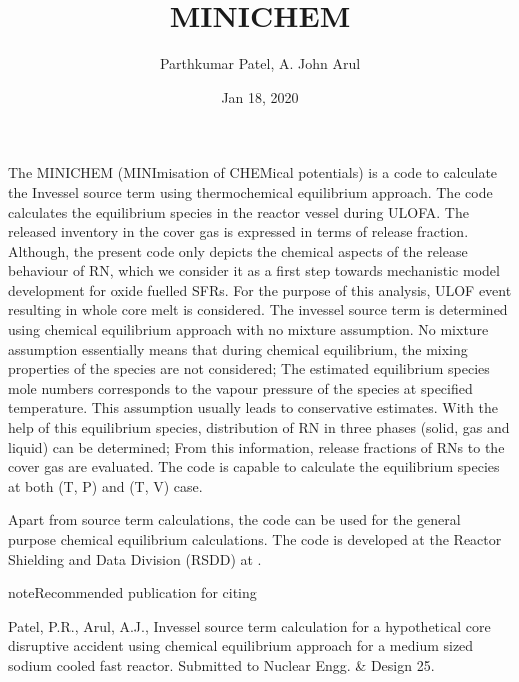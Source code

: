 \documentclass[letterpaper,10pt,english]{sphinxmanual}
\title{MINICHEM}
\date{Jan 18, 2020}
\author{Parthkumar Patel, A.\@{} John Arul}
\begin{document}
\pagestyle{empty}
\sphinxmaketitle
\pagestyle{plain}
\sphinxtableofcontents
\pagestyle{normal}
\label{\detokenize{index::doc}}


The MINICHEM (MINImisation of CHEMical potentials) is a code to calculate the In\sphinxhyphen{}vessel source term using thermochemical equilibrium approach. The code calculates the equilibrium species in the reactor vessel during ULOFA. The released inventory in the cover gas is expressed in terms of release fraction. Although, the
present code only depicts the chemical aspects of the release behaviour of RN,
which we consider it as a first step towards mechanistic model development for
oxide fuelled SFRs. For the purpose of this analysis, ULOF event resulting in
whole core melt is considered.
The in\sphinxhyphen{}vessel source term is determined using chemical equilibrium approach
with no mixture assumption. No mixture assumption essentially means that
during chemical equilibrium, the mixing properties of the species are not
considered; The estimated equilibrium species mole numbers corresponds to
the vapour pressure of the species at specified temperature. This assumption
usually leads to conservative estimates. With the help of this equilibrium
species, distribution of RN in three phases (solid, gas and liquid) can be
determined; From this information, release fractions of RNs to the cover gas
are evaluated. The code is capable to calculate the equilibrium species at both (T, P) and (T, V) case.

Apart from source term calculations, the code can be used for the
general purpose chemical equilibrium calculations. The
code is developed at the Reactor Shielding and Data Division (RSDD) at .

\begin{sphinxadmonition}{note}{Recommended publication for citing}

Patel, P.R., Arul, A.J., In\sphinxhyphen{}vessel source term calculation for a hypothetical core disruptive accident using chemical equilibrium approach for a medium sized sodium cooled fast reactor. Submitted to Nuclear Engg. \& Design 25.
\end{sphinxadmonition}
\end{document}

